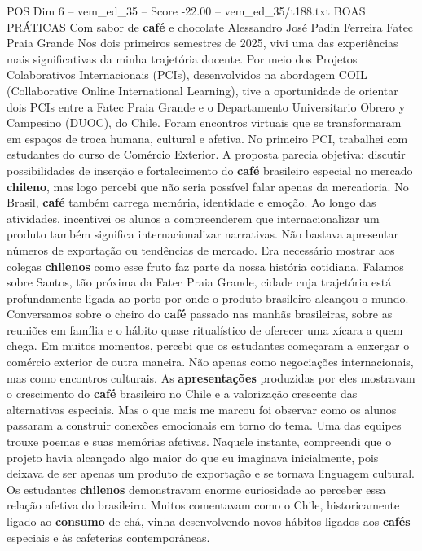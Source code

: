 \begin{textsample}{POS Dim 6 – vem\_ed\_35 – Score -22.00 – vem\_ed\_35/t188.txt}  \label{ex:f6_pos_155}
BOAS PRÁTICAS Com sabor de \textbf{café} e chocolate Alessandro José Padin Ferreira Fatec Praia Grande Nos dois primeiros semestres de 2025, vivi uma das experiências mais significativas da minha trajetória docente.
Por meio dos Projetos Colaborativos Internacionais (PCIs), desenvolvidos na abordagem COIL (Collaborative Online International Learning), tive a oportunidade de orientar dois PCIs entre a Fatec Praia Grande e o Departamento Universitario Obrero y Campesino (DUOC), do Chile.
Foram encontros virtuais que se transformaram em espaços de troca humana, cultural e afetiva.
No primeiro PCI, trabalhei com estudantes do curso de Comércio Exterior.
A proposta parecia objetiva: discutir possibilidades de inserção e fortalecimento do \textbf{café} brasileiro especial no mercado \textbf{chileno}, mas logo percebi que não seria possível falar apenas da mercadoria.
No Brasil, \textbf{café} também carrega memória, identidade e emoção.
Ao longo das atividades, incentivei os alunos a compreenderem que internacionalizar um produto também significa internacionalizar narrativas.
Não bastava apresentar números de exportação ou tendências de mercado.
Era necessário mostrar aos colegas \textbf{chilenos} como esse fruto faz parte da nossa história cotidiana.
Falamos sobre Santos, tão próxima da Fatec Praia Grande, cidade cuja trajetória está profundamente ligada ao porto por onde o produto brasileiro alcançou o mundo.
Conversamos sobre o cheiro do \textbf{café} passado nas manhãs brasileiras, sobre as reuniões em família e o hábito quase ritualístico de oferecer uma xícara a quem chega.
Em muitos momentos, percebi que os estudantes começaram a enxergar o comércio exterior de outra maneira.
Não apenas como negociações internacionais, mas como encontros culturais.
As \textbf{apresentações} produzidas por eles mostravam o crescimento do \textbf{café} brasileiro no Chile e a valorização crescente das alternativas especiais.
Mas o que mais me marcou foi observar como os alunos passaram a construir conexões emocionais em torno do tema.
Uma das equipes trouxe poemas e suas memórias afetivas.
Naquele instante, compreendi que o projeto havia alcançado algo maior do que eu imaginava inicialmente, pois deixava de ser apenas um produto de exportação e se tornava linguagem cultural.
Os estudantes \textbf{chilenos} demonstravam enorme curiosidade ao perceber essa relação afetiva do brasileiro.
Muitos comentavam como o Chile, historicamente ligado ao \textbf{consumo} de chá, vinha desenvolvendo novos hábitos ligados aos \textbf{cafés} especiais e às cafeterias contemporâneas.

\end{textsample}
